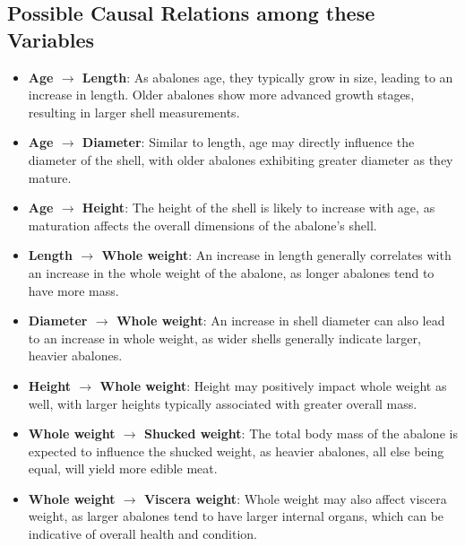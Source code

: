 \documentclass{article}
\begin{document}
\subsection{Possible Causal Relations among these Variables}

\begin{minipage}[t]{0.7\linewidth}
    \begin{itemize}
    \item \textbf{Age $\rightarrow$ Length}: As abalones age, they typically grow in size, leading to an increase in length. Older abalones show more advanced growth stages, resulting in larger shell measurements.
    
    \item \textbf{Age $\rightarrow$ Diameter}: Similar to length, age may directly influence the diameter of the shell, with older abalones exhibiting greater diameter as they mature.
    
    \item \textbf{Age $\rightarrow$ Height}: The height of the shell is likely to increase with age, as maturation affects the overall dimensions of the abalone's shell.

    \item \textbf{Length $\rightarrow$ Whole weight}: An increase in length generally correlates with an increase in the whole weight of the abalone, as longer abalones tend to have more mass.

    \item \textbf{Diameter $\rightarrow$ Whole weight}: An increase in shell diameter can also lead to an increase in whole weight, as wider shells generally indicate larger, heavier abalones.

    \item \textbf{Height $\rightarrow$ Whole weight}: Height may positively impact whole weight as well, with larger heights typically associated with greater overall mass.

    \item \textbf{Whole weight $\rightarrow$ Shucked weight}: The total body mass of the abalone is expected to influence the shucked weight, as heavier abalones, all else being equal, will yield more edible meat.

    \item \textbf{Whole weight $\rightarrow$ Viscera weight}: Whole weight may also affect viscera weight, as larger abalones tend to have larger internal organs, which can be indicative of overall health and condition.


\end{itemize}
\end{minipage}
\end{document}

